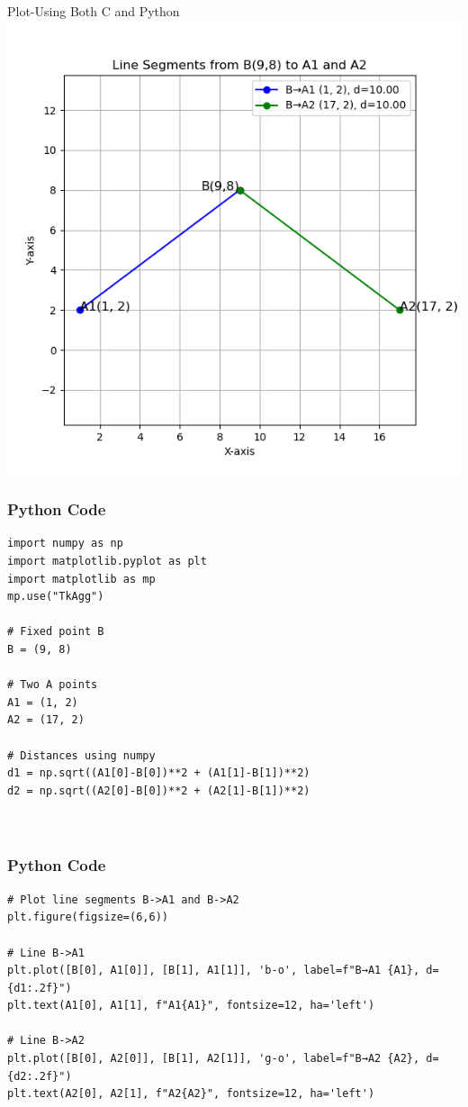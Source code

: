 \documentclass{beamer}
\begin{document}
\begin{frame}{Plot-Using Both C and Python}
    \centering
    \includegraphics[width=\columnwidth, height=0.8\textheight, keepaspectratio]{figs/distance.png}     
\end{frame}

\begin{frame}[fragile]
    \frametitle{Python Code}
    \begin{lstlisting}
import numpy as np
import matplotlib.pyplot as plt
import matplotlib as mp
mp.use("TkAgg")

# Fixed point B
B = (9, 8)

# Two A points
A1 = (1, 2)
A2 = (17, 2)

# Distances using numpy
d1 = np.sqrt((A1[0]-B[0])**2 + (A1[1]-B[1])**2)
d2 = np.sqrt((A2[0]-B[0])**2 + (A2[1]-B[1])**2)



\end{lstlisting}
\end{frame}

\begin{frame}[fragile]
    \frametitle{Python Code }
    \begin{lstlisting}
# Plot line segments B->A1 and B->A2
plt.figure(figsize=(6,6))

# Line B->A1
plt.plot([B[0], A1[0]], [B[1], A1[1]], 'b-o', label=f"B→A1 {A1}, d={d1:.2f}")
plt.text(A1[0], A1[1], f"A1{A1}", fontsize=12, ha='left')

# Line B->A2
plt.plot([B[0], A2[0]], [B[1], A2[1]], 'g-o', label=f"B→A2 {A2}, d={d2:.2f}")
plt.text(A2[0], A2[1], f"A2{A2}", fontsize=12, ha='left')


\end{lstlisting}
\end{frame}
\end{document}
